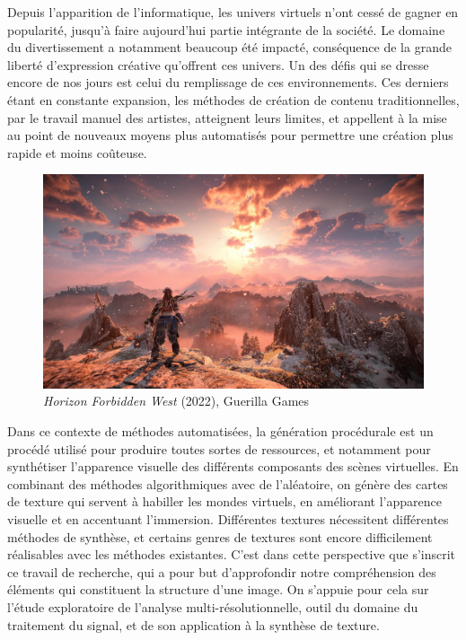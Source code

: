 \Introduction
\label{chap:introduction}

Depuis l'apparition de l'informatique, les univers virtuels n'ont cessé de gagner en popularité, jusqu'à faire aujourd'hui partie intégrante de la société. Le domaine du divertissement a notamment beaucoup été impacté, conséquence de la grande liberté d'expression créative qu'offrent ces univers. Un des défis qui se dresse encore de nos jours est celui du remplissage de ces environnements. Ces derniers étant en constante expansion, les méthodes de création de contenu traditionnelles, par le travail manuel des artistes, atteignent leurs limites, et appellent à la mise au point de nouveaux moyens plus automatisés pour permettre une création plus rapide et moins coûteuse.

\bigskip

\begin{figure}[!h]
    \centering
    \includegraphics[width=.75\textwidth]{contenu/resources/images/Horizon-Forbidden-West}
    \caption{{\it Horizon Forbidden West} (2022), Guerilla Games}
    \label{fig:horizon}
\end{figure}

Dans ce contexte de méthodes automatisées, la génération procédurale est un procédé utilisé pour produire toutes sortes de ressources, et notamment pour synthétiser l'apparence visuelle des différents composants des scènes virtuelles. En combinant des méthodes algorithmiques avec de l'aléatoire, on génère des cartes de texture qui servent à habiller les mondes virtuels, en améliorant l'apparence visuelle et en accentuant l'immersion. Différentes textures nécessitent différentes méthodes de synthèse, et certains genres de textures sont encore difficilement réalisables avec les méthodes existantes. C'est dans cette perspective que s'inscrit ce travail de recherche, qui a pour but d'approfondir notre compréhension des éléments qui constituent la structure d'une image. On s'appuie pour cela sur l'étude exploratoire de l'analyse multi-résolutionnelle, outil du domaine du traitement du signal, et de son application à la synthèse de texture.

